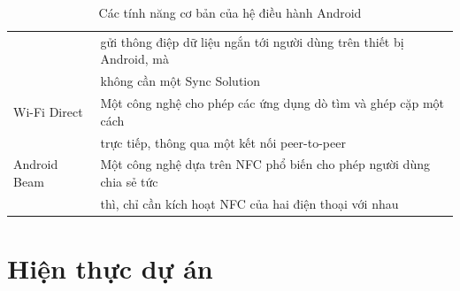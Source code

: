 \documentclass[a4paper]{article}
\begin{document}
\begin{table}[h]
\begin{tabular}{|l|l|}
				 & gửi thông điệp dữ liệu ngắn tới người dùng trên thiết bị Android, mà  \\
				 & không cần một Sync Solution \\
\hline
Wi-Fi Direct 	 & Một công nghệ cho phép các ứng dụng dò tìm và ghép cặp một cách \\ 
				 & trực tiếp, thông qua một kết nối peer-to-peer \\
\hline
Android Beam 	 & Một công nghệ dựa trên NFC phổ biến cho phép người dùng chia sẻ tức \\ 
				 & thì, chỉ cần kích hoạt NFC của hai điện thoại với nhau \\
\hline
\end{tabular}
\caption{Các tính năng cơ bản của hệ điều hành Android}
\label{my-label}
\end{table}
\section{Hiện thực dự án}
\end{document}
